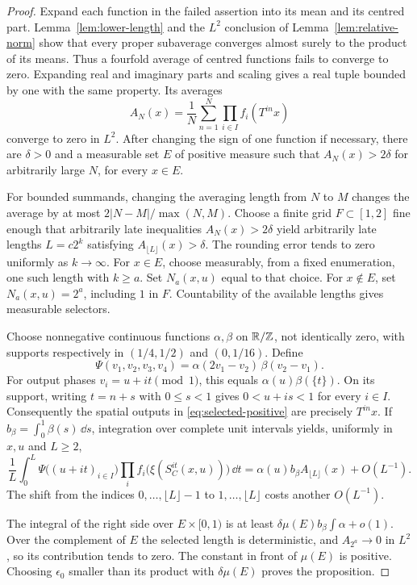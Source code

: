 \begin{proof}
Expand each function in the failed assertion into its mean and its
centred part.  Lemma~\ref{lem:lower-length} and the $L^2$ conclusion
of Lemma~\ref{lem:relative-norm} show that every proper subaverage
converges almost surely to the product of its means.  Thus a
fourfold average of centred functions fails to converge to zero.
Expanding real and imaginary parts and scaling gives a real tuple
bounded by one with the same property.  Its averages
\[
 A_N(x)=\frac1N\sum_{n=1}^N\prod_{i\in I}f_i(T^{in}x)
\]
converge to zero in $L^2$.  After changing the sign of one function
if necessary, there are $\delta>0$ and a measurable set $E$ of
positive measure such that $A_N(x)>2\delta$ for arbitrarily large
$N$, for every $x\in E$.

For bounded summands, changing the averaging length from $N$ to $M$
changes the average by at most $2|N-M|/\max(N,M)$.  Choose a finite
grid $F\subset[1,2]$ fine enough that arbitrarily late inequalities
$A_N(x)>2\delta$ yield arbitrarily late lengths $L=c2^k$ satisfying
$A_{\lfloor L\rfloor}(x)>\delta$.  The rounding error tends to zero
uniformly as $k\to\infty$.  For $x\in E$, choose measurably, from a
fixed enumeration, one such length with $k\ge a$.  Set $N_a(x,u)$
equal to that choice.  For $x\notin E$, set $N_a(x,u)=2^a$, including
$1$ in $F$.  Countability of the available lengths gives measurable
selectors.

Choose nonnegative continuous functions $\alpha,\beta$ on $\mathbb R/\mathbb Z$,
not identically zero, with supports respectively in $(1/4,1/2)$ and
$(0,1/16)$.  Define
\[
 \Psi(v_1,v_2,v_3,v_4)
 =\alpha(2v_1-v_2)\,\beta(v_2-v_1).
\]
For output phases $v_i=u+it\pmod1$, this equals
$\alpha(u)\beta(\{t\})$.  On its support, writing $t=n+s$ with
$0\le s<1$ gives $0<u+is<1$ for every $i\in I$.
Consequently the spatial outputs in \eqref{eq:selected-positive}
are precisely $T^{in}x$.  If $b_\beta=\int_0^1\beta(s)\,\dd s$,
integration over complete unit intervals yields, uniformly in $x,u$
and $L\ge2$,
\begin{equation}\label{eq:phase-selector-comparison}
 \frac1L\int_0^L\Psi\bigl((u+it)_{i\in I}\bigr)
       \prod_i f_i\bigl(\xi(S_C^{it}(x,u))\bigr)\,\dd t
 =\alpha(u)b_\beta A_{\lfloor L\rfloor}(x)+O(L^{-1}).
\end{equation}
The shift from the indices $0,\ldots,\lfloor L\rfloor-1$ to
$1,\ldots,\lfloor L\rfloor$ costs another $O(L^{-1})$.

The integral of the right side over $E\times[0,1)$ is at least
$\delta\mu(E)b_\beta\int\alpha+o(1)$.  Over the complement of $E$
the selected length is deterministic, and $A_{2^a}\to0$ in $L^2$,
so its contribution tends to zero.  The constant in front of
$\mu(E)$ is positive.  Choosing $\epsilon_0$ smaller than its
product with $\delta\mu(E)$ proves the proposition.
\end{proof}

